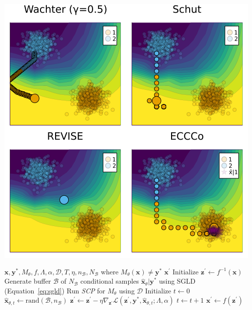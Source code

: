 \documentclass{article}
\begin{document}
\begin{minipage}[c]{0.40\textwidth}
  \centering
  \includegraphics[width=\textwidth]{../artifacts/results/images/poc.png}
   \label{fig:eccco}
\end{minipage}  
\hfill
\begin{minipage}[c]{0.50\textwidth}
\label{alg:eccco}
\begin{algorithmic}[1]
  \Require $\mathbf{x}, \mathbf{y}^*, M_{\theta}, f, \Lambda, \alpha, \mathcal{D}, T, \eta, n_{\mathcal{B}}, N_{\mathcal{B}}$ \linebreak where $M_{\theta}(\mathbf{x})\neq\mathbf{y}^*$
  \Ensure $\mathbf{x}^\prime$
  \State Initialize $\mathbf{z}^\prime \gets f^{-1}(\mathbf{x})$
  \State Generate buffer $\mathcal{B}$ of $N_{\mathcal{B}}$ conditional samples $\hat{\mathbf{x}}_{\theta}|\mathbf{y}^*$ using SGLD (Equation~\ref{eq:sgld})
  \State Run \textit{SCP} for $M_{\theta}$ using $\mathcal{D}$
  \State Initialize $t \gets 0$
  \State $\hat{\mathbf{x}}_{\theta, t} \gets \text{rand}(\mathcal{B},n_{\mathcal{B}})$
  \State $\mathbf{z}^\prime \gets \mathbf{z}^\prime - \eta \nabla_{\mathbf{z}^\prime} \mathcal{L}(\mathbf{z}^\prime,\mathbf{y}^*,\hat{\mathbf{x}}_{\theta, t}; \Lambda, \alpha)$
  \State $t \gets t+1$
  \EndWhile
  \State $\mathbf{x}^\prime \gets f(\mathbf{z}^\prime)$
\end{algorithmic}
\end{minipage}
\end{document}
